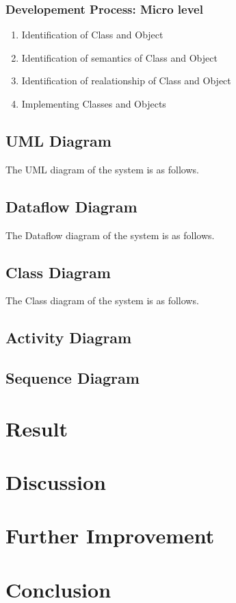 \documentclass[a4paper,12pt,onepage]{article}
\begin{document}
\subsubsection{Developement Process: Micro level}
\begin{enumerate}
\item Identification of Class and Object
\newpage
\item Identification of semantics of Class and Object
\newpage
\item Identification of realationship of Class and Object
\newpage
\item Implementing Classes and Objects
\newpage
\end{enumerate}
\subsection{UML Diagram}
The UML diagram of the system is as follows.

\newpage
\subsection{Dataflow Diagram}
The Dataflow diagram of the system is as follows.

\newpage
\subsection{Class Diagram}\par
The Class diagram of the system is as follows.

\newpage
\subsection{Activity Diagram}
\newpage
\subsection{Sequence Diagram}
\newpage

\section{Result}
\newpage
\section{Discussion}

\newpage
\section{Further Improvement}

\newpage
\section{Conclusion}

\newpage


\nocite{*}
\end{document}
